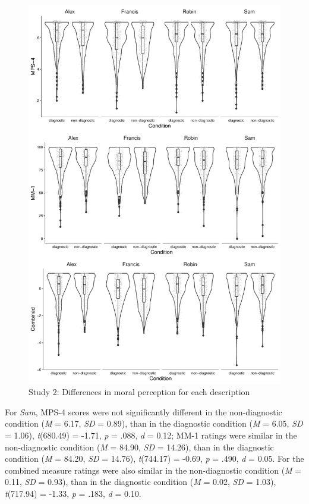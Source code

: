 \documentclass[
  american,
  man,mask,floatsintext]{apa6}
\begin{document}
\begin{figure}[!p]
\includegraphics{Supplementary_files/figure-latex/S2allscenariosPlot-1} \caption{Study 2: Differences in moral perception for each description}\label{fig:S2allscenariosPlot}
\end{figure}

For \emph{Sam}, MPS-4 scores were not significantly different in the non-diagnostic condition (\emph{M} = 6.17, \emph{SD} = 0.89), than in the diagnostic condition (\emph{M} = 6.05, \emph{SD} = 1.06), \emph{t}(680.49) = -1.71, \emph{p} = .088, \emph{d} = 0.12; MM-1 ratings were similar in the non-diagnostic condition (\emph{M} = 84.90, \emph{SD} = 14.26), than in the diagnostic condition (\emph{M} = 84.20, \emph{SD} = 14.76), \emph{t}(744.17) = -0.69, \emph{p} = .490, \emph{d} = 0.05. For the combined measure ratings were also similar in the non-diagnostic condition (\emph{M} = 0.11, \emph{SD} = 0.93), than in the diagnostic condition (\emph{M} = 0.02, \emph{SD} = 1.03), \emph{t}(717.94) = -1.33, \emph{p} = .183, \emph{d} = 0.10.
\end{document}
